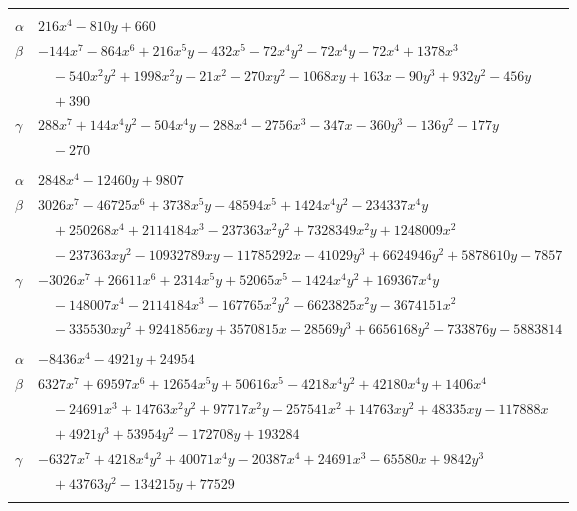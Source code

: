 \documentclass[11pt]{article}
\begin{document}
\begin{longtable}{@{}ll@{}}
\addlinespace[3pt]
\multicolumn{2}{@{}l}{$\{i,j\}=\{29,83\}$, $k_{ij}=2^{2}\cdot 3\cdot 5\cdot 11$}\\
$\alpha$ & $216x^{4}-810y+660$\\
$\beta$ & $-144x^{7}-864x^{6}+216x^{5}y-432x^{5}-72x^{4}y^{2}-72x^{4}y-72x^{4}+1378x^{3}$\\
 & $\quad -540x^{2}y^{2}+1998x^{2}y-21x^{2}-270xy^{2}-1068xy+163x-90y^{3}+932y^{2}-456y$\\
 & $\quad +390$\\
$\gamma$ & $288x^{7}+144x^{4}y^{2}-504x^{4}y-288x^{4}-2756x^{3}-347x-360y^{3}-136y^{2}-177y$\\
 & $\quad -270$\\
\addlinespace[3pt]
\multicolumn{2}{@{}l}{$\{i,j\}=\{30,33\}$, $k_{ij}=2\cdot 3\cdot 5^{2}\cdot 13$}\\
$\alpha$ & $2848x^{4}-12460y+9807$\\
$\beta$ & $3026x^{7}-46725x^{6}+3738x^{5}y-48594x^{5}+1424x^{4}y^{2}-234337x^{4}y$\\
 & $\quad +250268x^{4}+2114184x^{3}-237363x^{2}y^{2}+7328349x^{2}y+1248009x^{2}$\\
 & $\quad -237363xy^{2}-10932789xy-11785292x-41029y^{3}+6624946y^{2}+5878610y-7857$\\
$\gamma$ & $-3026x^{7}+26611x^{6}+2314x^{5}y+52065x^{5}-1424x^{4}y^{2}+169367x^{4}y$\\
 & $\quad -148007x^{4}-2114184x^{3}-167765x^{2}y^{2}-6623825x^{2}y-3674151x^{2}$\\
 & $\quad -335530xy^{2}+9241856xy+3570815x-28569y^{3}+6656168y^{2}-733876y-5883814$\\
\addlinespace[3pt]
\multicolumn{2}{@{}l}{$\{i,j\}=\{30,69\}$, $k_{ij}=2^{2}\cdot 3^{5}\cdot 5\cdot 13$}\\
$\alpha$ & $-8436x^{4}-4921y+24954$\\
$\beta$ & $6327x^{7}+69597x^{6}+12654x^{5}y+50616x^{5}-4218x^{4}y^{2}+42180x^{4}y+1406x^{4}$\\
 & $\quad -24691x^{3}+14763x^{2}y^{2}+97717x^{2}y-257541x^{2}+14763xy^{2}+48335xy-117888x$\\
 & $\quad +4921y^{3}+53954y^{2}-172708y+193284$\\
$\gamma$ & $-6327x^{7}+4218x^{4}y^{2}+40071x^{4}y-20387x^{4}+24691x^{3}-65580x+9842y^{3}$\\
 & $\quad +43763y^{2}-134215y+77529$\\
\addlinespace[3pt]
\multicolumn{2}{@{}l}{$\{i,j\}=\{30,96\}$, $k_{ij}=2\cdot 3\cdot 5$}\\

\end{longtable}
\end{document}
